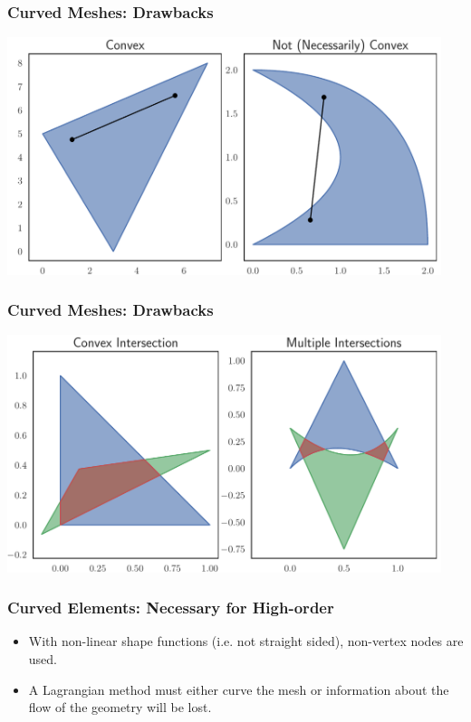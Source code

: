 \documentclass{beamer}
\begin{document}
\begin{frame}
\frametitle{Curved Meshes: Drawbacks}
\begin{center}
\includegraphics[width=0.95\textwidth]
                {../images/slides/not_convex.pdf}
\end{center}
\end{frame}

\begin{frame}
\frametitle{Curved Meshes: Drawbacks}
\begin{center}
\includegraphics[width=0.95\textwidth]
                {../images/slides/split_intersection.pdf}
\end{center}
\end{frame}

\begin{frame}
\frametitle{Curved Elements: Necessary for High-order}
\begin{itemize}
\pause
\item With non-linear shape functions (i.e. not straight sided), non-vertex
nodes are used.
\pause
\item A Lagrangian method must either curve the mesh or information about the
flow of the geometry will be lost.
\end{itemize}
\end{frame}
\end{document}
